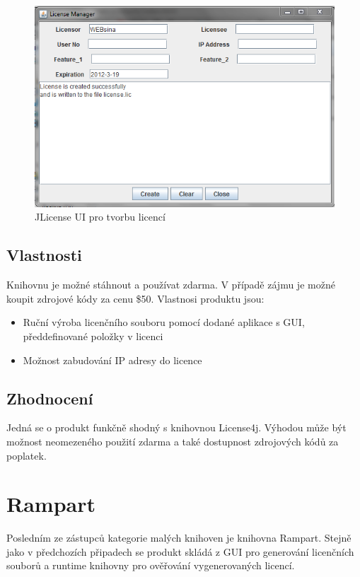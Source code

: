 \begin{figure}[H]
\begin{center}
\includegraphics[width=16cm]{figures/jlicense.PNG}
\caption{JLicense UI pro tvorbu licencí}
\label{fig:jlicense-ui} 
\end{center}
\end{figure}

\subsection*{Vlastnosti}
Knihovnu je možné stáhnout a používat zdarma. V případě zájmu je možné koupit
zdrojové kódy za cenu \$50. Vlastnosi produktu jsou:

\begin{itemize}
  \item Ruční výroba licenčního souboru pomocí dodané aplikace s GUI,
  předdefinované položky v licenci
  \item Možnost zabudování IP adresy do licence
\end{itemize}

\subsection*{Zhodnocení}
Jedná se o produkt funkčně shodný s knihovnou License4j. Výhodou může být
možnost neomezeného použití zdarma a také dostupnost zdrojových kódů za
poplatek.


\section{Rampart}
Posledním ze zástupců kategorie malých knihoven je knihovna
Rampart\cite{rampart}. Stejně jako v předchozích připadech se produkt skládá z
GUI pro generování licenčních souborů a runtime knihovny pro ověřování
vygenerovaných licencí.

